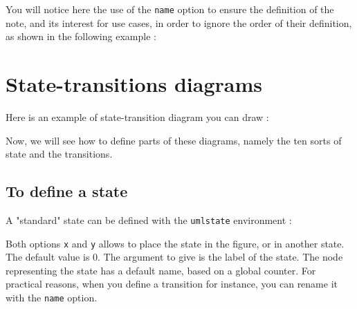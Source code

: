 \documentclass[a4paper,11pt]{report}
\newcommand{\inputTikZ}[1]{%
  }%
\newcommand{\inputTikZ}[1]{%
    \texttt{[image: fig/\#1.pdf]}%
  }%
\begin{document}
You will notice here the use of the {\tt name} option to ensure the definition of the note, and its interest for use cases, in order to ignore the order of their definition, as shown in the following example :

\vspace{-0.4cm}
{\color{red!70!black}

}

\begin{center}
\inputTikZ{usecasediagstep4}
\end{center}

\chapter{State-transitions diagrams}\label{c.statetrans}

Here is an example of state-transition diagram you can draw :

\begin{center}
\inputTikZ{statediagex}
\end{center}

Now, we will see how to define parts of these diagrams, namely the ten sorts of state and the transitions.

\newpage

\section{To define a state}\label{s.state}

A "standard" state can be defined with the {\tt umlstate} environment :

\medskip

\begin{minipage}{0.51\textwidth}

\end{minipage}
\begin{minipage}{0.49\textwidth}
\begin{center}
\inputTikZ{state}
\end{center}
\end{minipage}

\medskip

Both options {\tt x} and {\tt y} allows to place the state in the figure, or in another state. 
The default value is 0. The argument to give is the label of the state. The node representing the state has a default name, based on a global counter. 
For practical reasons, when you define a transition for instance, you can rename it with the {\tt name} option.
\end{document}
